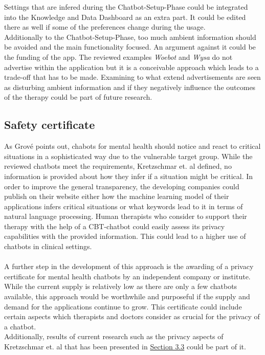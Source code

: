 \documentclass[sigconf, nonacm]{acmart}
\begin{document}
Settings that are infered during the Chatbot-Setup-Phase could be integrated into the Knowledge and Data Dashboard as an extra part. It could be edited there as well if some of the preferences change during the usage.
\\
Additionally to the Chatbot-Setup-Phase, too much ambient information should be avoided and the main functionality focused. An argument against it could be the funding of the app. The reviewed examples \emph{Woebot} and \emph{Wysa} do not advertise within the application but it is a conceivable approach which leads 
to a trade-off that has to be made. Examining to what extend advertisements are seen as disturbing ambient information and if they negatively influence the outcomes of the therapy could be part of future research. 
\\
\subsection{Safety certificate}
\label{sec:four_three}
As Grové \cite{Grove2021} points out, chabots for mental health should notice and react to critical situations in a sophisticated way due to the vulnerable target group. While the reviewed chatbots meet the requirements, Kretzschmar et. al \cite{Kretzschmar2019} defined,
no information is provided about how they infer if a situation might be critical. In order to improve the general transparency, the developing companies could publish on their website either how the machine learning model of their applications infers 
critical situations or what keywords lead to it in terms of natural language processing. Human therapists who consider to support their therapy with the help of a CBT-chatbot could easily assess its privacy capabilities with the provided information. This could lead to a higher use of chatbots in clinical settings.\\
\\
A further step in the development of this approach is the awarding of a privacy certificate for mental health chatbots by an independent company or institute. While the current supply is relatively low as there are only a few chatbots available, this approach would be worthwhile and purposeful if the supply and demand for the applications continue to grow. 
This certificate could include certain aspects which therapists and doctors consider as crucial for the privacy of a chatbot.\\ 
Additionally, results of current research such as the privacy aspects of Kretzschmar et. al \cite{Kretzschmar2019} that has been presented in \hyperref[sec:three_three]{Section 3.3} could be part of it.  
\end{document}
